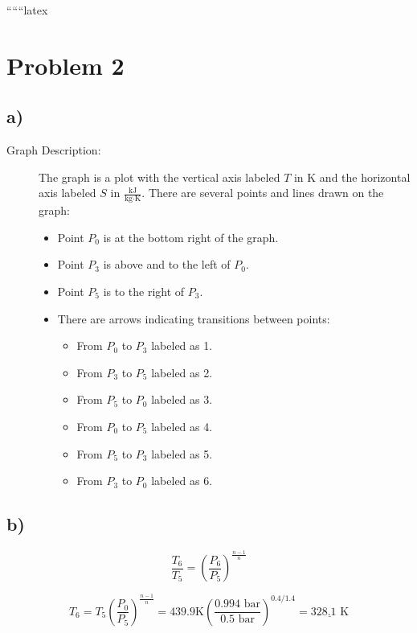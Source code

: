 
``````latex


\section*{Problem 2}

\subsection*{a)}

\begin{description}
    \item[Graph Description:] The graph is a plot with the vertical axis labeled $T \text{ in K}$ and the horizontal axis labeled $S \text{ in } \frac{\text{kJ}}{\text{kg} \cdot \text{K}}$. There are several points and lines drawn on the graph:
    \begin{itemize}
        \item Point $P_0$ is at the bottom right of the graph.
        \item Point $P_3$ is above and to the left of $P_0$.
        \item Point $P_5$ is to the right of $P_3$.
        \item There are arrows indicating transitions between points:
        \begin{itemize}
            \item From $P_0$ to $P_3$ labeled as 1.
            \item From $P_3$ to $P_5$ labeled as 2.
            \item From $P_5$ to $P_0$ labeled as 3.
            \item From $P_0$ to $P_5$ labeled as 4.
            \item From $P_5$ to $P_3$ labeled as 5.
            \item From $P_3$ to $P_0$ labeled as 6.
        \end{itemize}
    \end{itemize}
\end{description}

\subsection*{b)}

\begin{equation*}
    \frac{T_6}{T_5} = \left( \frac{P_6}{P_5} \right)^{\frac{n-1}{n}}
\end{equation*}

\begin{equation*}
    T_6 = T_5 \left( \frac{P_0}{P_5} \right)^{\frac{n-1}{n}} = 439.9 \text{K} \left( \frac{0.994 \text{ bar}}{0.5 \text{ bar}} \right)^{0.4/1.4} = \underline{328.1 \text{ K}}
\end{equation*}

